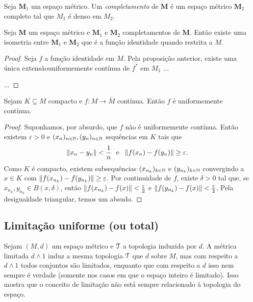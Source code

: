 \begin{definition}
Seja $\bm M_1$  um espaço métrico. Um \emph{completamento} de $\bm M$ é um espaço métrico $\bm M_2$ completo tal que $M_1$ é denso em $M_2$.
\end{definition}

\begin{proposition}
Seja $\bm M$ um espaço métrico e $\bm M_1$ e $\bm M_2$ completamentos de $\bm M$. Então existe uma isometria entre $\bm M_1$ e $\bm M_2$ que é a função identidade quando restrita a $M$.
\end{proposition}
\begin{proof}
	Seja $f$ a função identidade em $M$. Pela proposição anterior, existe uma única extensãouniformemente contínua de $f^*$ em $M_1$ ...
	
	...
\end{proof}


\begin{proposition}
Sejam $K \subseteq M$ compacto e $f: M \to \bar M$ contínua. Então $f$ é uniformemente contínua.
\end{proposition}
\begin{proof}
Suponhamos, por absurdo, que $f$ não é uniformemente contínua. Então existem $\varepsilon > 0$ e $(x_n)_{n \in \mathbb{N}},(y_n)_{n \in \mathbb{N}}$ sequências em $K$ tais que
	\begin{equation*}
	\left\Vert{x_n - y_n}\right\Vert < \frac{1}{n} \text{\ \ e\ \ } \left\Vert{f(x_n)-f(y_n)}\right\Vert \geq \varepsilon.
	\end{equation*}
Como $K$ é compacto, existem subsequências $(x_{n_k})_{k \in \mathbb{N}}$  e $(y_{n_k})_{k \in \mathbb{N}}$ convergindo a $x \in K$ com $\left\Vert{f(x_{n_k})-f(y_{n_k})}\right\Vert \geq \varepsilon$. Por continuidade de $f$, existe $\delta > 0$ tal que, se $x_{n_k},y_{n_k} \in B(x,\delta)$, então $\left\Vert{f(x_{n_k})-f(x)}\right\Vert < \frac{\varepsilon}{2}$ e $\left\Vert{f(y_{n_k})-f(x)}\right\Vert < \frac{\varepsilon}{2}$. Pela desigualdade triangular, temos um absudo.
\end{proof}


\subsection{Limitação uniforme (ou total)}

Sejam $(M,d)$ um espaço métrico e $\mathcal{T}$ a topologia induzida por $d$. A métrica limitada $d \wedge 1$ induz a mesma topologia $\mathcal{T}$ que $d$ sobre $M$, mas com respeito a $d \wedge 1$ todos conjuntos são limitados, enquanto que com respeito a $d$ isso nem sempre é verdade (somente nos casos em que o espaço inteiro é limitado). Isso mostra que o conceito de limitação não está sempre relacionado à topologia do espaço.


